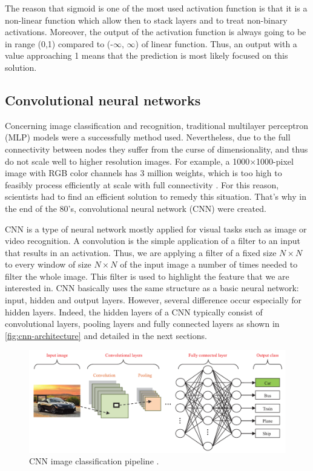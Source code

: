 \documentclass[11pt, openany]{report}
\theoremstyle{plain}
\theoremstyle{definition}
\theoremstyle{remark}
\begin{document}
The reason that sigmoid is one of the most used activation function is that it is a non-linear function which allow then to stack layers and to treat non-binary activations. Moreover, the output of the activation function is always going to be in range (0,1) compared to (-$\infty$, $\infty$) of linear function. Thus, an output with a value approaching 1 means that the prediction is most likely focused on this solution. 

\subsection{Convolutional neural networks} \label{sec:CNN}
Concerning image classification and recognition, traditional multilayer perceptron (MLP) models were a successfully method used. Nevertheless, due to the full connectivity between nodes they suffer from the curse of dimensionality, and thus do not scale well to higher resolution images. For example, a 1000×1000-pixel image with RGB color channels has 3 million weights, which is too high to feasibly process efficiently at scale with full connectivity \cite{wiki-cnn}. For this reason, scientists had to find an efficient solution to remedy this situation. That's why in the end of the 80's, convolutional neural network (CNN) were created. 

CNN is a type of neural network mostly applied for visual tasks such as image or video recognition.  A convolution is the simple application of a filter to an input that results in an activation. Thus, we are applying a filter of a fixed size $N \times N$ to every window of size $N \times N$ of the input image a number of times needed to filter the whole image. This filter is used to highlight the feature that we are interested in. CNN basically uses the same structure as a basic neural network: input, hidden and output layers. However, several difference occur especially for hidden layers. Indeed, the hidden layers of a CNN typically consist of convolutional layers, pooling layers and fully connected layers as shown in \autoref{fig:cnn-architecture} and detailed in the next sections. 

\begin{figure}[h]
  \centering
  \includegraphics[scale=0.55]{figures/cnn-architecture.png}
  \caption{CNN image classification pipeline \cite{CNN-1}.}
  \label{fig:cnn-architecture}
\end{figure}
\end{document}
